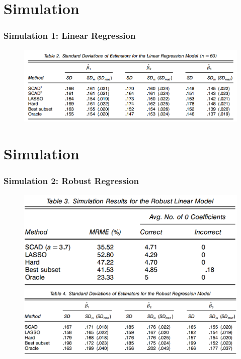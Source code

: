 \documentclass{beamer}
\begin{document}
	\section{Simulation}
	\begin{frame}
		\frametitle{Simulation 1: Linear Regression}
		\begin{figure}
			\includegraphics[width=0.9\linewidth]{image020.png}
		\end{figure}
	\end{frame}
	
	
	
	\section{Simulation}
	\begin{frame}
		\frametitle{Simulation 2: Robust Regression}
		\begin{figure}
			\includegraphics[width=0.6\linewidth]{image021.png}
			\includegraphics[width=0.9\linewidth]{image022.png}
		\end{figure}
	\end{frame}
	
\end{document}
